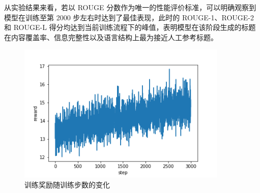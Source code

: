 \documentclass[10pt,a4paper]{article}
\begin{document}
从实验结果来看，若以 ROUGE 分数作为唯一的性能评价标准，可以明确观察到模型在训练至第 2000 步左右时达到了最佳表现，此时的 ROUGE-1、ROUGE-2 和 ROUGE-L 得分均达到当前训练流程下的峰值，表明模型在该阶段生成的标题在内容覆盖率、信息完整性以及语言结构上最为接近人工参考标题。

\begin{figure}[H]
  \centering
  \includegraphics[width=10cm]{fig/reward.png}
  \caption{训练奖励随训练步数的变化}\label{fig:reward}
\end{figure}
\end{document}
